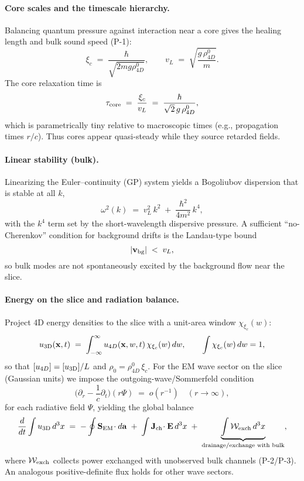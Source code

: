 \paragraph{Core scales and the timescale hierarchy.}
Balancing quantum pressure against interaction near a core gives the healing length and bulk sound speed (P-1):
\begin{equation}
\xi_c \;=\; \frac{\hbar}{\sqrt{2 m g \rho_{4D}^0}},
\qquad
v_L \;=\; \sqrt{\frac{g\,\rho_{4D}^0}{m}}.
\end{equation}
The core relaxation time is
\begin{equation}
\tau_{\rm core} \;=\; \frac{\xi_c}{v_L} \;=\; \frac{\hbar}{\sqrt{2}\,g\,\rho_{4D}^0},
\end{equation}
which is parametrically tiny relative to macroscopic times (e.g., propagation times $r/c$). Thus cores appear quasi-steady while they source retarded fields.

\paragraph{Linear stability (bulk).}
Linearizing the Euler–continuity (GP) system yields a Bogoliubov dispersion that is stable at all $k$,
\begin{equation}
\omega^2(k) \;=\; v_L^2\,k^2 \;+\; \frac{\hbar^2}{4m^2}\,k^4,
\end{equation}
with the $k^4$ term set by the short-wavelength dispersive pressure. A sufficient “no-Cherenkov” condition for background drifts is the Landau-type bound
\begin{equation}
|\mathbf v_{\rm bg}| \;<\; v_L,
\end{equation}
so bulk modes are not spontaneously excited by the background flow near the slice.

\paragraph{Energy on the slice and radiation balance.}
Project 4D energy densities to the slice with a unit-area window $\chi_{\xi_c}(w)$:
\begin{equation}
u_{\rm 3D}(\mathbf x,t) \;=\; \int_{-\infty}^{\infty} u_{4D}(\mathbf x,w,t)\,\chi_{\xi_c}(w)\,dw,
\qquad \int \chi_{\xi_c}(w)\,dw=1,
\end{equation}
so that $[u_{4D}]=[u_{\rm 3D}]/L$ and $\rho_0=\rho_{4D}^0\,\xi_c$. For the EM wave sector on the slice (Gaussian units) we impose the outgoing-wave/Sommerfeld condition
\[
\Big(\partial_r-\frac{1}{c}\partial_t\Big)\!(r\Psi)\;=\;o(r^{-1})\quad (r\to\infty),
\]
for each radiative field $\Psi$, yielding the global balance
\begin{equation}
\frac{d}{dt}\int u_{\rm 3D}\,d^3x
\;=\; -\oint \mathbf S_{\rm EM}\!\cdot d\mathbf a
\;+\;\int \mathbf J_{\rm ch}\!\cdot\mathbf E\,d^3x
\;+\;\underbrace{\int \mathcal W_{\rm exch}\,d^3x}_{\text{drainage/exchange with bulk}},
\end{equation}
where $\mathcal W_{\rm exch}$ collects power exchanged with unobserved bulk channels (P-2/P-3). An analogous positive-definite flux holds for other wave sectors.

